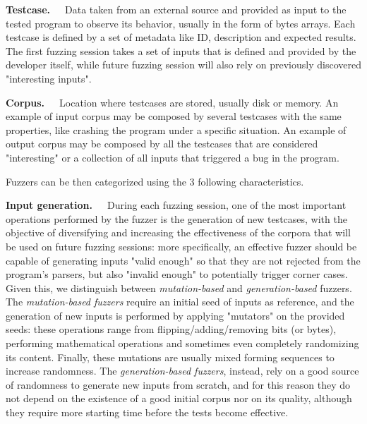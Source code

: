 \textbf{Testcase.}\ \ \ Data taken from an external source and provided as input to the tested program to observe its behavior, usually in the form of bytes arrays. Each testcase is defined by a set of metadata like ID, description and expected results. The first fuzzing session takes a set of inputs that is defined and provided by the developer itself, while future fuzzing session will also rely on previously discovered "interesting inputs". 

\textbf{Corpus.}\ \ \ Location where testcases are stored, usually disk or memory. An example of input corpus may be composed by several testcases with the same properties, like crashing the program under a specific situation. An example of output corpus may be composed by all the testcases that are considered "interesting" or a collection of all inputs that triggered a bug in the program.








\newpage
Fuzzers can be then categorized using the 3 following characteristics.

\textbf{Input generation.}\ \ \  During each fuzzing session, one of the most important operations performed by the fuzzer is the generation of new testcases, with the objective of diversifying and increasing the effectiveness of the corpora that will be used on future fuzzing sessions: more specifically, an effective fuzzer should be capable of generating inputs "valid enough" so that they are not rejected from the program's parsers, but also "invalid enough" to potentially trigger corner cases. Given this, we  distinguish between \textit{mutation-based} and \textit{generation-based} fuzzers. The \textit{mutation-based fuzzers} require an initial seed of inputs as reference, and the generation of new inputs is performed by applying "mutators" on the provided seeds: these operations range from flipping/adding/removing bits (or bytes), performing mathematical operations and sometimes even completely randomizing its content. Finally, these mutations are usually mixed forming sequences to increase randomness. The \textit{generation-based fuzzers}, instead, rely on a good source of randomness to generate new inputs from scratch, and for this reason they do not depend on the existence of a good initial corpus nor on its quality, although they require more starting time before the tests become effective.

